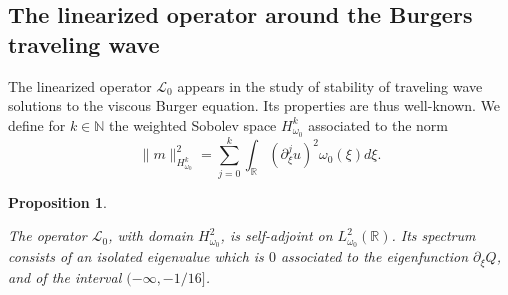 \documentclass[11pt]{aims}
\newtheorem{proposition}[theorem]{Proposition}
\theoremstyle{definition}
\newtheorem{remark}[theorem]{Remark}
\newcommand{\Oc}{\mathcal{O}}
\newcommand{\Ls}{\mathscr{L}}
\newcommand{\pa}{\partial}
\numberwithin{equation}{section}
\begin{document}
%

\subsection{The linearized operator around the Burgers traveling wave}

The linearized operator $\Ls_0$ appears in the study of stability of traveling wave solutions to the viscous Burger equation. Its properties are thus well-known. We define for $k\in \mathbb N$ the weighted Sobolev space $H^k_{\omega_0}$ associated to the norm
$$
\| m\|_{H^k_{\omega_0}}^2=\sum_{j=0}^k \int_{\mathbb R} (\pa_\xi^j u)^2\omega_0(\xi)d\xi .
$$

\begin{proposition} \label{pr:spectralL0}

The operator $\Ls_0$, with domain $H^2_{\omega_0}$, is self-adjoint on $L^2_{\omega_0}(\mathbb{R})$. Its spectrum consists of an isolated eigenvalue which is $0$ associated to the eigenfunction $\pa_\xi Q$, and of the interval $(-\infty,-1/16]$.

\end{proposition}
\end{document}
